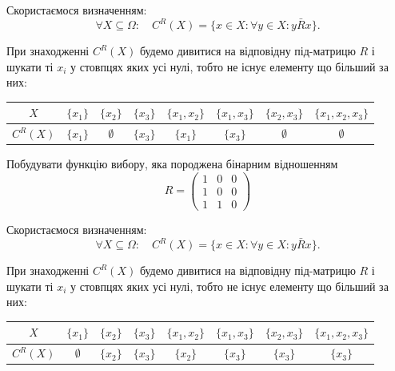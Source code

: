 \begin{solution}
    Скористаємося визначенням: \[ \forall X \subseteq \Omega: \quad C^R(X) = \{ x \in X: \forall y \in X: y \bar R x \}.\]
    
    При знаходженні $C^R(X)$ будемо дивитися на відповідну під-матрицю $R$ і шукати ті $x_i$ у стовпцях яких усі нулі, тобто не існує елементу що більший за них:
    
    \begin{table}[H]
        \centering
        \begin{tabular}{|c|c|c|c|c|c|c|c|}
            \hline
            $X$ & $\{x_1\}$ & $\{x_2\}$ & $\{x_3\}$ & $\{x_1, x_2\}$ & $\{x_1, x_3\}$ & $\{x_2, x_3\}$ & $\{x_1, x_2, x_3\}$ \\ \hline
                $C^R(X)$ & $\{x_1\}$ & $\emptyset$ & $\{x_3\}$ & $\{x_1\}$ & $\{x_3\}$ & $\emptyset$ & $\emptyset$ \\ \hline
        \end{tabular}
    \end{table}
\end{solution}

\begin{problem}
    Побудувати функцію вибору, яка породжена бінарним відношенням \[ R = \begin{pmatrix} 1 & 0 & 0 \\ 1 & 0 & 0 \\ 1 & 1 & 0 \end{pmatrix} \]
\end{problem}

\begin{solution}
    Скористаємося визначенням: \[ \forall X \subseteq \Omega: \quad C^R(X) = \{ x \in X: \forall y \in X: y \bar R x \}.\]

    При знаходженні $C^R(X)$ будемо дивитися на відповідну під-матрицю $R$ і шукати ті $x_i$ у стовпцях яких усі нулі, тобто не існує елементу що більший за них:
    \begin{table}[H]
        \centering
        \begin{tabular}{|c|c|c|c|c|c|c|c|}
            \hline
            $X$ & $\{x_1\}$ & $\{x_2\}$ & $\{x_3\}$ & $\{x_1, x_2\}$ & $\{x_1, x_3\}$ & $\{x_2, x_3\}$ & $\{x_1, x_2, x_3\}$ \\ \hline
            $C^R(X)$ & $\emptyset$ & $\{x_2\}$ & $\{x_3\}$ & $\{x_2\}$ & $\{x_3\}$ & $\{x_3\}$ & $\{x_3\}$ \\ \hline
        \end{tabular}
    \end{table}
\end{solution}


